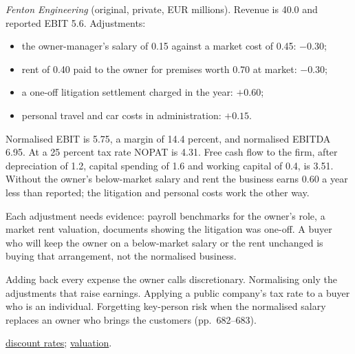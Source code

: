 \begin{qfmethod}
 \emph{Fenton Engineering} (original, private, EUR millions). Revenue is 40.0 and reported EBIT 5.6. Adjustments:
\begin{itemize}
\item the owner-manager's salary of 0.15 against a market cost of 0.45: $-0.30$;
\item rent of 0.40 paid to the owner for premises worth 0.70 at market: $-0.30$;
\item a one-off litigation settlement charged in the year: $+0.60$;
\item personal travel and car costs in administration: $+0.15$.
\end{itemize}
Normalised EBIT is 5.75, a margin of 14.4 percent, and normalised EBITDA 6.95. At a 25 percent tax rate NOPAT is 4.31. Free cash flow to the firm, after depreciation of 1.2, capital spending of 1.6 and working capital of 0.4, is 3.51. Without the owner's below-market salary and rent the business earns 0.60 a year less than reported; the litigation and personal costs work the other way.

 Each adjustment needs evidence: payroll benchmarks for the owner's role, a market rent valuation, documents showing the litigation was one-off. A buyer who will keep the owner on a below-market salary or the rent unchanged is buying that arrangement, not the normalised business.

 Adding back every expense the owner calls discretionary. Normalising only the adjustments that raise earnings. Applying a public company's tax rate to a buyer who is an individual. Forgetting key-person risk when the normalised salary replaces an owner who brings the customers (pp.~682--683).

 \hyperref[meth:private-discount-rate]{discount rates}; \hyperref[meth:private-company-valuation]{valuation}.

\end{qfmethod}

